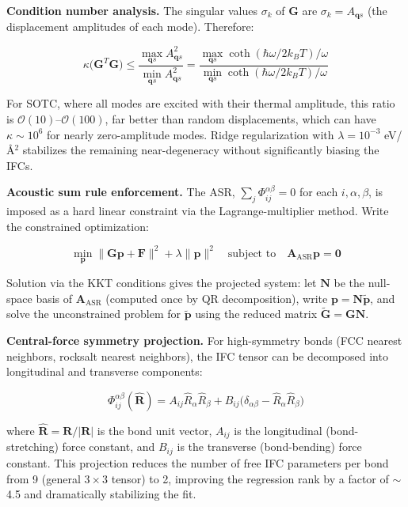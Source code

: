 \documentclass[aps,prb,reprint,amsmath,amssymb,floatfix]{revtex4-2}
\begin{document}
\textbf{Condition number analysis.} The singular values \(\sigma_k\) of
\(\mathbf{G}\) are \(\sigma_k = A_{\mathbf{q}s}\) (the displacement
amplitudes of each mode). Therefore:

\begin{equation*}
\kappa\bigl(\mathbf{G}^T\mathbf{G}\bigr) \leq \frac{\max_{\mathbf{q}s}A_{\mathbf{q}s}^2}{\min_{\mathbf{q}s}A_{\mathbf{q}s}^2} = \frac{\max_{\mathbf{q}s}\coth(\hbar\omega/2k_BT)/\omega}{\min_{\mathbf{q}s}\coth(\hbar\omega/2k_BT)/\omega}
\end{equation*}

For SOTC, where all modes are excited with their thermal amplitude, this
ratio is \(\mathcal{O}(10)\)--\(\mathcal{O}(100)\), far better than
random displacements, which can have \(\kappa \sim 10^6\) for nearly
zero-amplitude modes. Ridge regularization with \(\lambda = 10^{-3}\)
eV/Å\(^2\) stabilizes the remaining near-degeneracy without
significantly biasing the IFCs.

\textbf{Acoustic sum rule enforcement.} The ASR,
\(\sum_j\Phi_{ij}^{\alpha\beta} = 0\) for each \(i,\alpha,\beta\), is
imposed as a hard linear constraint via the Lagrange-multiplier method.
Write the constrained optimization:

\begin{equation*}
\min_\mathbf{p}\|\mathbf{G}\mathbf{p}+\mathbf{F}\|^2 + \lambda\|\mathbf{p}\|^2 \quad\text{subject to}\quad \mathbf{A}_\text{ASR}\mathbf{p} = \mathbf{0}
\end{equation*}

Solution via the KKT conditions gives the projected system: let
\(\mathbf{N}\) be the null-space basis of \(\mathbf{A}_\text{ASR}\)
(computed once by QR decomposition), write
\(\mathbf{p} = \mathbf{N}\tilde{\mathbf{p}}\), and solve the
unconstrained problem for \(\tilde{\mathbf{p}}\) using the reduced
matrix \(\tilde{\mathbf{G}} = \mathbf{G}\mathbf{N}\).

\textbf{Central-force symmetry projection.} For high-symmetry bonds (FCC
nearest neighbors, rocksalt nearest neighbors), the IFC tensor can be
decomposed into longitudinal and transverse components:

\begin{equation*}
\Phi_{ij}^{\alpha\beta}(\hat{\mathbf{R}}) = A_{ij}\hat{R}_\alpha\hat{R}_\beta + B_{ij}\bigl(\delta_{\alpha\beta} - \hat{R}_\alpha\hat{R}_\beta\bigr)
\end{equation*}

where \(\hat{\mathbf{R}} = \mathbf{R}/|\mathbf{R}|\) is the bond unit
vector, \(A_{ij}\) is the longitudinal (bond-stretching) force constant,
and \(B_{ij}\) is the transverse (bond-bending) force constant. This
projection reduces the number of free IFC parameters per bond from 9
(general \(3\times3\) tensor) to 2, improving the regression rank by a
factor of $\sim$4.5 and dramatically stabilizing the fit.
\end{document}
